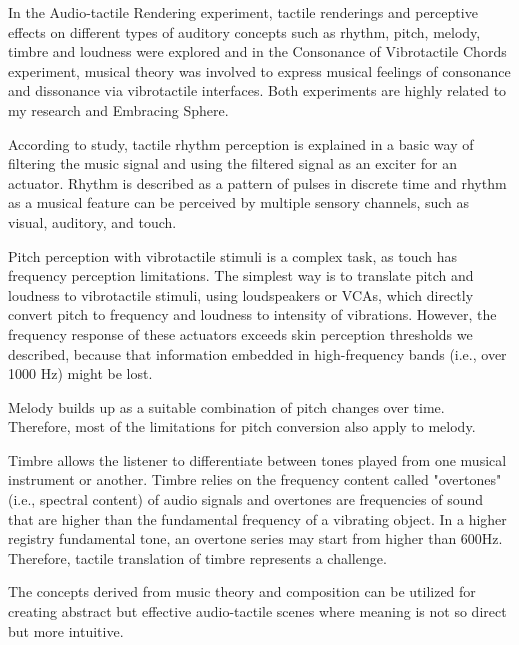             In the Audio-tactile Rendering experiment\cite{Audio-Tactile_Rendering}, tactile renderings and perceptive effects on different types of auditory concepts such as rhythm, pitch, melody, timbre and loudness were explored and in the Consonance of Vibrotactile Chords experiment\cite{Consonance_of_Vibrotactile_Chords}, musical theory was involved to express musical feelings of consonance and dissonance via vibrotactile interfaces. Both experiments are highly related to my research and Embracing Sphere.

            According to study\cite{Audio-Tactile_Rendering}, tactile rhythm perception is explained in a basic way of filtering the music signal and using the filtered signal as an exciter for an actuator. Rhythm is described as a pattern of pulses in discrete time and rhythm as a musical feature can be perceived by multiple sensory channels, such as visual, auditory, and touch.\par

            Pitch perception with vibrotactile stimuli is a complex task, as touch has frequency perception limitations. The simplest way is to translate pitch and loudness to vibrotactile stimuli, using loudspeakers or VCAs, which directly convert pitch to frequency and loudness to intensity of vibrations. However, the frequency response of these actuators exceeds skin perception thresholds we described, because that information embedded in high-frequency bands (i.e., over 1000 Hz) might be lost.\par

            Melody builds up as a suitable combination of pitch changes over time. Therefore, most of the limitations for pitch conversion also apply to melody.\par

            Timbre allows the listener to differentiate between tones played from one musical instrument or another. Timbre relies on the frequency content called "overtones" (i.e., spectral content) of audio signals and overtones are frequencies of sound that are higher than the fundamental frequency of a vibrating object. In a higher registry fundamental tone, an overtone series may start from higher than 600Hz. Therefore, tactile translation of timbre represents a challenge.\par

            The concepts derived from music theory and composition can be utilized for creating abstract but effective audio-tactile scenes where meaning is not so direct but more intuitive.\par

